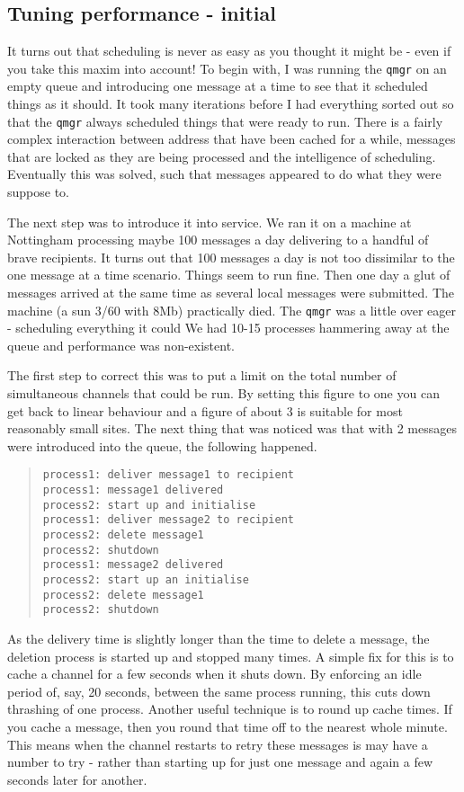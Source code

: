 \subsection{Tuning performance - initial}
It turns out that scheduling is never as easy as you thought it might
be - even if you take this maxim into account! To begin with, I was
running the \verb|qmgr| on an empty queue and introducing one message at a
time to see that it scheduled things as it should. It took many
iterations before I had everything sorted out so that the \verb|qmgr| always
scheduled things that were ready to run. There is a fairly complex
interaction between address that have been cached for a while,
messages that are locked as they are being processed and the
intelligence of scheduling. Eventually this was solved, such that
messages appeared to do what they were suppose to.

The next step was to introduce it into service. We ran it on a machine
at Nottingham processing maybe 100 messages a day delivering to a
handful of brave recipients. It turns out that 100 messages a day is
not too dissimilar to the one message at a time scenario. Things seem
to run fine. Then one day a glut of messages arrived at the same time
as several local messages were submitted. The machine (a sun 3/60 with
8Mb) practically died. The \verb|qmgr| was a little over eager -
scheduling everything it could We had 10-15 processes hammering away
at the queue and performance was non-existent.

The first step to correct this was to put a limit on the total number
of simultaneous channels that could be run. By setting this figure to
one you can get back to linear behaviour and a figure of about 3 is
suitable for most reasonably small sites. The next thing that was
noticed was that with 2 messages were introduced into the queue, the
following happened.
\begin{quote}\small\begin{verbatim}
process1: deliver message1 to recipient
process1: message1 delivered
process2: start up and initialise
process1: deliver message2 to recipient
process2: delete message1
process2: shutdown
process1: message2 delivered
process2: start up an initialise
process2: delete message1
process2: shutdown
\end{verbatim}\end{quote}
As the delivery time is slightly longer than the time to delete a
message, the deletion process is started up and stopped many times. A
simple fix for this is to cache a channel for a few seconds when it
shuts down. By enforcing an idle period of, say, 20 seconds, between
the same process running, this cuts down thrashing of one process.
Another useful technique is to round up cache times. If you cache a
message, then you round that time off to the nearest whole minute.
This means when the channel restarts to retry these messages is may
have a number to try - rather than starting up for just one message
and again a few seconds later for another.

